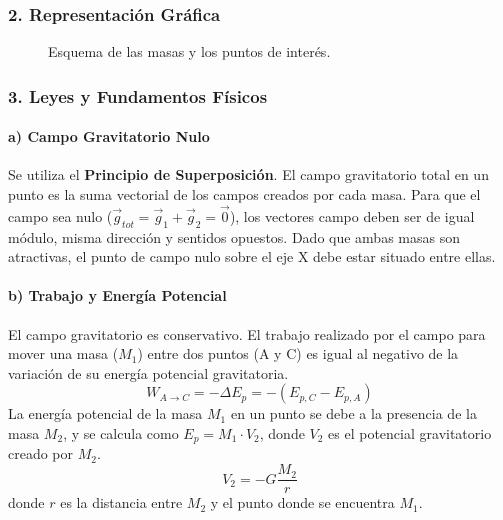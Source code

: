 \subsubsection*{2. Representación Gráfica}
\begin{figure}[H]
    \centering
    \caption{Esquema de las masas y los puntos de interés.}
\end{figure}

\subsubsection*{3. Leyes y Fundamentos Físicos}
\paragraph*{a) Campo Gravitatorio Nulo}
Se utiliza el \textbf{Principio de Superposición}. El campo gravitatorio total en un punto es la suma vectorial de los campos creados por cada masa. Para que el campo sea nulo ($\vec{g}_{tot} = \vec{g}_1 + \vec{g}_2 = \vec{0}$), los vectores campo deben ser de igual módulo, misma dirección y sentidos opuestos. Dado que ambas masas son atractivas, el punto de campo nulo sobre el eje X debe estar situado entre ellas.

\paragraph*{b) Trabajo y Energía Potencial}
El campo gravitatorio es conservativo. El trabajo realizado por el campo para mover una masa ($M_1$) entre dos puntos (A y C) es igual al negativo de la variación de su energía potencial gravitatoria.
$$ W_{A \to C} = -\Delta E_p = -(E_{p,C} - E_{p,A}) $$
La energía potencial de la masa $M_1$ en un punto se debe a la presencia de la masa $M_2$, y se calcula como $E_p = M_1 \cdot V_2$, donde $V_2$ es el potencial gravitatorio creado por $M_2$.
$$ V_2 = -G \frac{M_2}{r} $$
donde $r$ es la distancia entre $M_2$ y el punto donde se encuentra $M_1$.

